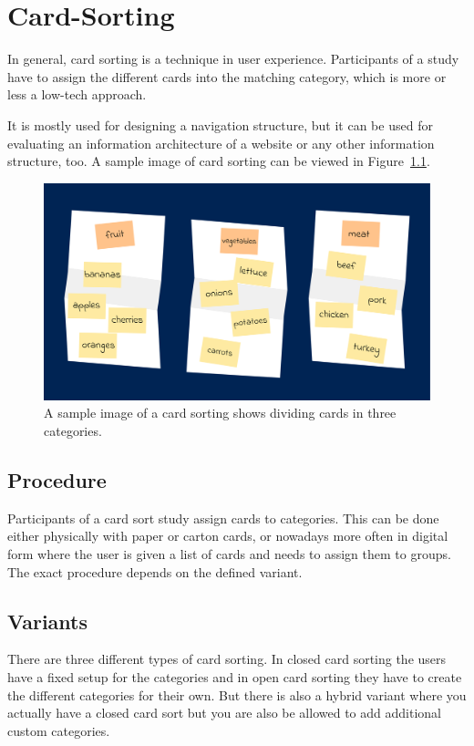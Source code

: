 \chapter{Card-Sorting}
\label{chap:Card-Sorting}

In general, card sorting is a technique in user experience. Participants 
of a study have to assign the different cards into the matching 
category, which is more or less a low-tech approach. 

It is mostly used for designing a navigation structure, but it can be used 
for evaluating an information architecture of a website or any other 
information structure, too.
A sample image of card sorting can be viewed in Figure~\ref{fig:sample}. 

\begin{figure}[tp]  \centering
\includegraphics[keepaspectratio,width=\linewidth,height=\halfh]{images/card-sorting/sample.png}
\caption[Sample Image of Card Sorting] 
{A sample image of a card sorting shows dividing cards in three categories.
 } 
\label{fig:sample} 
\end{figure}


\section{Procedure}
Participants of a card sort study assign cards to categories. This can be done
either physically with paper or carton cards, or nowadays more often in digital
form where the user is given a list of cards and needs to assign them to groups.
The exact procedure depends on the defined variant.


\section{Variants}
There are three different types of card sorting. In closed card sorting 
the users have a fixed setup for the categories and in open card sorting 
they have to create the different categories for their own. But there is also 
a hybrid variant where you actually have a closed card sort but you are 
also be allowed to add additional custom categories.  






